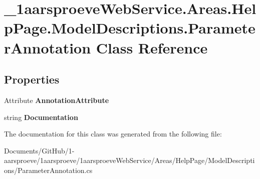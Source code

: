 \hypertarget{class__1aarsproeve_web_service_1_1_areas_1_1_help_page_1_1_model_descriptions_1_1_parameter_annotation}{}\section{\+\_\+1aarsproeve\+Web\+Service.\+Areas.\+Help\+Page.\+Model\+Descriptions.\+Parameter\+Annotation Class Reference}
\label{class__1aarsproeve_web_service_1_1_areas_1_1_help_page_1_1_model_descriptions_1_1_parameter_annotation}
\subsection*{Properties}
\begin{DoxyCompactItemize}
\item 
\hypertarget{class__1aarsproeve_web_service_1_1_areas_1_1_help_page_1_1_model_descriptions_1_1_parameter_annotation_acd0669e175d07c79c1ec50f2bd9ddc0a}{}Attribute {\bfseries Annotation\+Attribute}\label{class__1aarsproeve_web_service_1_1_areas_1_1_help_page_1_1_model_descriptions_1_1_parameter_annotation_acd0669e175d07c79c1ec50f2bd9ddc0a}

\item 
\hypertarget{class__1aarsproeve_web_service_1_1_areas_1_1_help_page_1_1_model_descriptions_1_1_parameter_annotation_a243d8f762b1bc6d9aa2bcef2b295f56d}{}string {\bfseries Documentation}\label{class__1aarsproeve_web_service_1_1_areas_1_1_help_page_1_1_model_descriptions_1_1_parameter_annotation_a243d8f762b1bc6d9aa2bcef2b295f56d}

\end{DoxyCompactItemize}


The documentation for this class was generated from the following file\+:\begin{DoxyCompactItemize}
\item 
Documents/\+Git\+Hub/1-\/aarsproeve/1aarsproeve/1aarsproeve\+Web\+Service/\+Areas/\+Help\+Page/\+Model\+Descriptions/Parameter\+Annotation.\+cs\end{DoxyCompactItemize}
